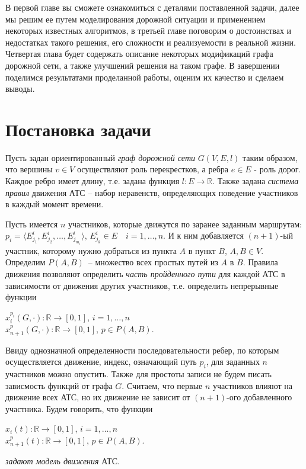 \documentclass[12pt, a4paper]{article}
\begin{document}
В первой главе вы сможете ознакомиться с деталями поставленной задачи, далее мы решим ее путем моделирования дорожной ситуации и применением некоторых известных алгоритмов, в третьей главе поговорим о достоинствах и недостатках такого решения, его сложности и реализуемости в реальной жизни. Четвертая глава будет содержать описание некоторых модификаций графа дорожной сети, а также улучшений решения на таком графе. В завершении поделимся результатами проделанной работы, оценим их качество и сделаем выводы.




\newpage
\section{Постановка задачи}
Пусть задан ориентированный \textit{граф дорожной сети} $ G (V, E, l)$ таким образом, что вершины $ v \in V$ осуществляют роль перекрестков, а ребра $e \in E$ - роль дорог. Каждое ребро имеет длину, т.е. задана функция $l : E \rightarrow \mathbb {R} $. Также задана \textit{система правил} движения АТС -- набор неравенств, определяющих поведение участников в каждый момент времени.

Пусть имеется $n$ участников, которые движутся по заранее заданным маршрутам:  $ p_i = \langle E^i_{j_1}, E^i_{j_2}, \dots, E^i_{j_{m_i}} \rangle$, $ E^i_{j_k} \in E \quad i = 1, \dots, n$. И к ним добавляется $(n+1)$-ый участник, которому нужно добраться из пункта $A$ в пункт $B$, $A, B \in V$. Определим $P(A,B)$~-- множество всех простых путей из $A$ в $B$. Правила движения позволяют определить \textit{часть пройденного пути} для каждой АТС в зависимости от движения других участников, т.е. определить непрерывные функции
\begin{center}
 $x^{p_i}_i(G, \cdot ) : \mathbb {R} \rightarrow [0 , 1] $, $i = 1, \dots, n$ \\ $x^{p}_{n+1}(G, \cdot ) : \mathbb {R} \rightarrow [0 , 1]$, $p \in P(A, B) $.
\end{center}
Ввиду однозначной определенности последовательности ребер, по которым осуществляется движение, индекс, означающий путь $p_i$, для заданных $n$ участников можно опустить. Также для простоты записи не будем писать зависмость функций от графа $G$. Считаем, что первые $n$ участников влияют на движение всех АТС, но их движение не зависит от $(n+1)$-ого добавленного участника. Будем говорить, что функции 
\begin{center}
	$x_i(t) : \mathbb {R} \rightarrow [0 , 1] $, $i = 1, \dots, n$ \\ $x^{p}_{n+1}(t) : \mathbb {R} \rightarrow [0 , 1]$, $p \in P(A, B) $.
\end{center}
\textit{задают модель движения} АТС.
\end{document}
